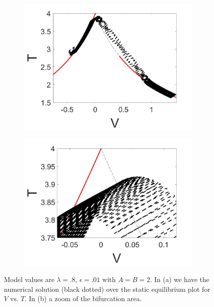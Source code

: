 \begin{figure}[H]
\centering
\begin{subfigure}{.5\textwidth}
  \centering
  \includegraphics[width=\linewidth]{twoD/slowosc_Tplot_small.jpg}
  \caption{}
\end{subfigure}%
\begin{subfigure}{.5\textwidth}
  \centering
  \includegraphics[width=\linewidth]{twoD/slowosc_Tplot_small_zoom.jpg}
  \caption{}
\end{subfigure}
\caption{Model values are $\lambda=.8$, $\epsilon=.01$ with $A=B=2$. In (a) we have the numerical solution (black dotted) over the static equilibrium plot for $V$ vs. $T$. In (b) a zoom of the bifurcation area.}
\label{fig:twoD_slowosc_Tnumerics_small}
\end{figure}

